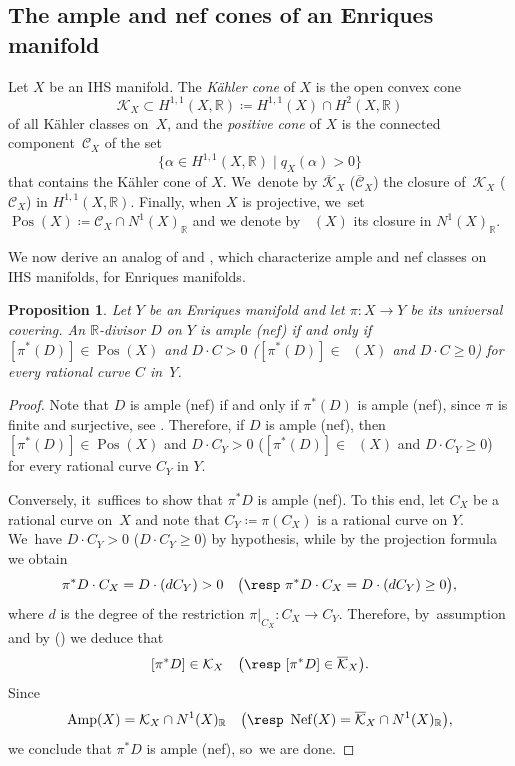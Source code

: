 \documentclass[JEP,XML,SOM,Unicode,published]{cedram}
\theoremstyle{plain}
\newtheorem{prop}[thm]{Proposition}
\theoremstyle{definition}
\newcommand{\R}{\mathbb{R}}
\DeclareMathOperator{\Amp}{\mathrm{Amp}}
\DeclareMathOperator{\Nef}{\mathrm{Nef}}
\DeclareMathOperator{\Pos}{\mathrm{Pos}}
\DeclareMathOperator{\Posb}{\overline{\mathrm{Pos}}}
\begin{document}
\subsection{The ample and nef cones of an Enriques manifold}

Let $X$ be an IHS manifold. The \emph{Kähler cone} of $X$ is the open convex cone
\[
\mathcal{K}_X \subset H^{1,1}(X,\R) \coloneqq H^{1,1}(X) \cap H^2(X,\R)
\]
of all Kähler classes on~$X$, and the \emph{positive cone} of $X$ is the connected component~$\mathcal{C}_X$ of the set
\[
\bigl\{ \alpha \in H^{1,1}(X,\R) \mid q_X(\alpha) > 0 \bigr\}
\]
that contains the Kähler cone of $X$. We~denote by $\overline{\mathcal{K}}_X$ (\resp $\overline{\mathcal{C}}_X$) the closure of~$\mathcal{K}_X$ (\resp $\mathcal{C}_X$) in $H^{1,1}(X,\R)$. Finally, when $X$ is projective, we~set \hbox{$ \Pos(X) \!\coloneqq\! \mathcal{C}_X \!\cap\! N^1(X)_\R $} and we denote by $\Posb(X)$ its closure in $N^1(X)_\R$.

We now derive an analog of \cite[Th.\,1.2]{Boucksom01} and \cite[Prop.\,3.2]{Huy03}, which characterize ample and nef classes on IHS manifolds, for Enriques manifolds.

\begin{prop}
\label{prop:positivity_on_Enriques}
Let $Y$ be an Enriques manifold and let $\pi \colon X \to Y$ be its universal covering. An $\R$\nobreakdash-divisor $D$ on $Y$ is ample (\resp nef) if and only if $[\pi^*(D)] \in \Pos(X)$ and $D \cdot C \!>\! 0$ (\resp $[\pi^*(D)] \!\in\! \Posb(X)$ and $D \cdot C \!\geq\! 0$) for every rational curve $C$ in~$Y$.
\end{prop}

\begin{proof}
Note that $D$ is ample (\resp nef) if and only if $\pi^*(D)$ is ample (\resp nef), since $\pi$ is finite and surjective, see \cite[Prop.\,1.2.13, Cor.\,1.2.28 \& Ex.\,1.4.4]{Laz04book_I}. Therefore, if $D$ is ample (\resp nef), then $[\pi^*(D)] \in \Pos(X)$ and $D \cdot C_Y > 0$ (\resp $[\pi^*(D)] \in \Posb(X)$ and $D \cdot C_Y \geq 0$) for every rational curve $C_Y$ in $Y$.

Conversely, it~suffices to show that $\pi^* D$ is ample (\resp nef). To this end, let $C_X$ be a rational curve on~$X$ and note that $C_Y \coloneq \pi(C_X)$ is a rational curve on $Y$. We~have $D \cdot C_Y > 0$ (\resp $D \cdot C_Y \geq 0$) by hypothesis, while by the projection formula we obtain
\[
\pi^* D \cdot C_X = D \cdot (d C_Y) > 0 \quad \bigl(\text{\resp } \pi^* D \cdot C_X = D \cdot (d C_Y) \geq 0 \bigr),
\]
where $d$ is the degree of the restriction $\pi |_{C_X} \colon C_X \to C_Y$. Therefore, by~assumption and by \cite[Th.\,1.2]{Boucksom01} (\resp \cite[Prop.\,3.2]{Huy03})
we deduce that
\[
[\pi^* D] \in \mathcal{K}_X \quad \bigl(\text{\resp } [\pi^* D] \in \overline{\mathcal{K}}_X \bigr).
\]
Since
\[
\Amp(X) = \mathcal{K}_X \cap N^1(X)_\R \quad \bigl(\text{\resp } \Nef(X) = \overline{\mathcal{K}}_X \cap N^1(X)_\R \bigr),
\]
we conclude that $\pi^* D$ is ample (\resp nef), so~we are done.
\end{proof}
\end{document}
